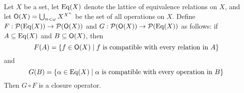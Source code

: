 \begin{example}
  Let $X$ be a set, let $\operatorname{Eq}(X)$ denote the lattice of equivalence relations on $X$, and let
  $\mathsf{O}(X) = \bigcup_{n< \omega} X^{X^n}$ be the set of all operations on $X$.
  Define $F : \mathcal{P}(\operatorname{Eq}(X)) \to \mathcal{P}(\mathsf{O}(X))$
  and $G :\mathcal{P}(\mathsf{O}(X)) \to \mathcal{P}(\operatorname{Eq}(X))$ as follows:
  if $A \subseteq\operatorname{Eq}(X)$ and $B \subseteq \mathsf{O}(X)$, then
  \[
  F(A) = \{f \in \mathsf{O}(X) \mid f \text{ is compatible with every relation in $A$}\}
  \]
  and
  \[
  G(B) = \{\alpha \in \operatorname{Eq}(X) \mid \alpha \text{ is compatible with every operation in $B$}\}
  \]
  Then $G \circ F$ is a closure operator.
\end{example}
\newcommand{\Luv}{\ensuremath{L_{u,v}}}
\newcommand{\bLuv}{\ensuremath{\mathbf{L}_{u,v}}}
\newcommand{\juv}{\ensuremath{\vee_{u,v}}}
\newcommand{\suv}{\ensuremath{\sigma_{u,v}}}
